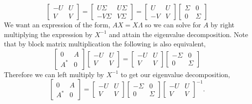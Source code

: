 \documentclass[12pt]{article}
\makeatletter
\theoremstyle{homework}
\newenvironment{exercise}[1]
{\def\@currentlabel{#1}\exercisecore}
{\endexercisecore}
\makeatother
\begin{document}
\begin{exercise}{5.4}
\begin{equation*}
    \begin{bmatrix}
      -U & U\\
      V & V
    \end{bmatrix}
    =
   \begin{bmatrix}
      U\Sigma & U\Sigma\\
      -V\Sigma & V\Sigma
    \end{bmatrix}
    = 
    \begin{bmatrix}
      U & U\\
      -V & V
    \end{bmatrix}
    \begin{bmatrix}
      \Sigma & 0\\
      0 & \Sigma
    \end{bmatrix}
  \end{equation*}
  We want an expression of the form, $AX = X\Lambda$ so we can solve for $A$ by right multiplying the expression 
  by $X^{-1}$ and attain the eigenvalue decomposition. Note that by block matrix multiplication the following is also equivalent, 
  \begin{equation*}
    \begin{bmatrix}
      0 & A\\
      A^* & 0
    \end{bmatrix}
    \begin{bmatrix}
      -U & U\\
      V & V
    \end{bmatrix}
     = 
     \begin{bmatrix}
      -U & U\\
      V & V
    \end{bmatrix}
    \begin{bmatrix}
      -\Sigma & 0\\
      0 & \Sigma
    \end{bmatrix}
  \end{equation*}
  Therefore we can left multiply by $X^{-1}$ to get our eigenvalue decomposition, 
  \begin{equation*}
    \begin{bmatrix}
      0 & A\\
      A^* & 0
    \end{bmatrix}
     = 
     \begin{bmatrix}
      -U & U\\
      V & V
    \end{bmatrix}
    \begin{bmatrix}
      -\Sigma & 0\\
      0 & \Sigma
    \end{bmatrix}
    \begin{bmatrix}
      -U & U\\
      V & V
    \end{bmatrix}^{-1}.
  \end{equation*}




\end{exercise}
\vspace{1in}
\end{document}
